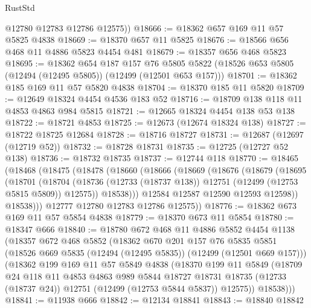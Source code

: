 \begin{lexlean}{RustStd}
\begin{coremodule}
        @12780
        @12783
        @12786
        @12575))
@18666 := @18362 @657 @169 @11 @57 @5825 @4838
@18669 := @18370 @657 @11 @5825
@18676 := @18566 @656 @468 @11 @4886 @5823 @4454 @481
@18679 := @18357 @656 @468 @5823
@18695 := @18362
    @654
    @187
    @157
    @76
    @5805
    @5822
    (@18526 @653 @5805 (@12494 (@12495 @5805)) (@12499 (@12501 @653 @157)))
@18701 := @18362 @185 @169 @11 @57 @5820 @4838
@18704 := @18370 @185 @11 @5820
@18709 := @12649 @18324 @4454 @4536 @183 @52
@18716 := @18709 @138 @118 @11 @4853 @4863 @984 @5815
@18721 := @12665 @18324 @4454 @138 @53 @138
@18722 := @18721 @4853
@18725 := @12673 (@12674 @18324 @138)
@18727 := @18722 @18725 @12684
@18728 := @18716 @18727
@18731 := @12687 (@12697 (@12719 @52))
@18732 := @18728 @18731
@18735 := @12725 (@12727 @52 @138)
@18736 := @18732 @18735
@18737 := @12744 @118
@18770 := @18465
    (@18468
      (@18475
        (@18478
          (@18660
            (@18666
              (@18669
                (@18676
                  (@18679
                    (@18695
                      (@18701
                        (@18704
                          (@18736
                            (@12733 (@18737 @138))
                            @12751
                            (@12499 (@12753 @5815 @5809))
                            @12575))
                        @18538)))
                  @12584
                  @12587
                  @12590
                  @12593
                  @12598))
              @18538)))
        @12777
        @12780
        @12783
        @12786
        @12575))
@18776 := @18362 @673 @169 @11 @57 @5854 @4838
@18779 := @18370 @673 @11 @5854
@18780 := @18347 @666
@18840 := @18780
    @672
    @468
    @11
    @4886
    @5852
    @4454
    @1138
    (@18357
      @672
      @468
      @5852
      (@18362
        @670
        @201
        @157
        @76
        @5835
        @5851
        (@18526 @669 @5835 (@12494 (@12495 @5835)) (@12499 (@12501 @669 @157)))
        (@18362
          @199
          @169
          @11
          @57
          @5849
          @4838
          (@18370
            @199
            @11
            @5849
            (@18709
              @24
              @118
              @11
              @4853
              @4863
              @989
              @5844
              @18727
              @18731
              @18735
              (@12733 (@18737 @24))
              @12751
              (@12499 (@12753 @5844 @5837))
              @12575))
          @18538)))
@18841 := @11938 @666
@18842 := @12134 @18841
@18843 := @18840 @18842

\end{coremodule}
\end{lexlean}
